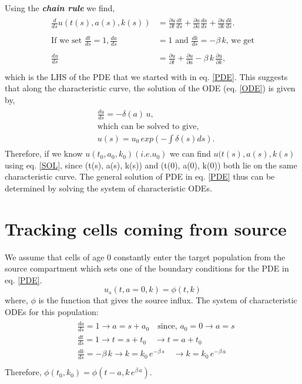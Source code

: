 \documentclass[11pt]{article}
\newcommand{\ie}{\textit{i.e.}}
\begin{document}
Using the \textbf{\textit{chain rule}} we find, 
\begin{eqnarray*}
	\begin{aligned}
		\frac{d}{ds}u(t(s), a(s), k(s)) &= \frac{\partial u}{\partial t} \frac{dt}{ds} +\frac{\partial u}{\partial a} \frac{da}{ds} + \frac{\partial u}{\partial k} \frac{dk}{ds}. \\
		\\
		\text{If we set } \frac{dt}{ds} = 1, \frac{da}{ds} &= 1 \text{ and } \frac{dk}{ds} = - \beta \, k \text{, we get} \\
		\\
		\frac{du}{ds} &=\frac{\partial u}{\partial t} +\frac{\partial u}{\partial a} - \beta \, k \, \frac{\partial u}{\partial k}, \\
	\end{aligned}
\end{eqnarray*}
which is the LHS of the PDE that we started with in eq. \ref{PDE}.
This suggests that along the characteristic curve, the solution of the ODE (eq. \ref{ODE}) is given by,
\begin{eqnarray}
	\begin{aligned}
	&\frac{du}{ds} = - \delta(a) \, u, \\
	&\text{which can be solved to give,} \\
	&u(s) = u_0 \, exp(- \int \delta(s) ds).
	\end{aligned}
	\label{SOL}
\end{eqnarray}
Therefore, if we know $u(t_0, a_0, k_0) (\ie u_0)$ we can find $u(t(s), a(s), k(s)$ using eq. \ref{SOL}, since (t(s), a(s), k(s)) and (t(0), a(0), k(0)) both lie on the same characteristic curve.
The general solution of PDE in eq. \ref{PDE} thus can be determined by solving the system of characteristic ODEs.

\section*{Tracking cells coming from source}
We assume that cells of age 0 constantly enter the target population from the source compartment which sets one of the boundary conditions for the PDE in eq. \ref{PDE}.
\begin{equation*}
	u_{s}(t, a=0, k) = \phi(t, k)
\end{equation*}
where, $\phi$ is the function that gives the source influx.
The system of characteristic ODEs for this population:
\begin{eqnarray*}
	\begin{aligned}
	&\frac{da}{ds} = 1 \rightarrow a = s + a_0 \quad \text{since,  } a_0 = 0 \rightarrow a=s\\
	&\frac{dt}{ds} = 1 \rightarrow t = s + t_0 \quad \rightarrow t=a+t_0\\
	&\frac{dk}{ds} = -\beta \, k \rightarrow k = k_0 \, e^{-\beta \, s} \quad \rightarrow k = k_0 \, e^{-\beta \, a} \\
	\end{aligned}
\end{eqnarray*}
Therefore, $\phi(t_0, k_0) = \phi(t-a, k \, e^{\beta \, a})$.
\end{document}
